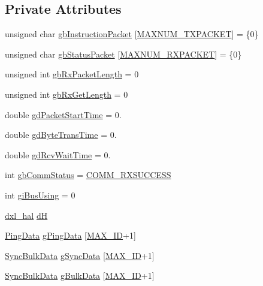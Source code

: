 \subsection*{Private Attributes}
\begin{DoxyCompactItemize}
\item 
unsigned char \hyperlink{classdynamixel2_a298efe9115fdbf77019af1001e801fb4}{gb\+Instruction\+Packet} \mbox{[}\hyperlink{dxl__hal_8h_ad753363487043da5d9fdd3fd1071f59e}{M\+A\+X\+N\+U\+M\+\_\+\+T\+X\+P\+A\+C\+K\+E\+T}\mbox{]} = \{0\}
\item 
unsigned char \hyperlink{classdynamixel2_a0776f210a190cf57d1a6faf9697a593d}{gb\+Status\+Packet} \mbox{[}\hyperlink{dxl__hal_8h_a37d5ce8f0a9ee058fa9674502c6a8b3a}{M\+A\+X\+N\+U\+M\+\_\+\+R\+X\+P\+A\+C\+K\+E\+T}\mbox{]} = \{0\}
\item 
unsigned int \hyperlink{classdynamixel2_a7ae9bffcc9f4b087c57640881ccbb378}{gb\+Rx\+Packet\+Length} = 0
\item 
unsigned int \hyperlink{classdynamixel2_ad82d286e6b47c7243a3c5fd5ced0ebf4}{gb\+Rx\+Get\+Length} = 0
\item 
double \hyperlink{classdynamixel2_ac9746f2c7ed6d706152d6d0d502993c0}{gd\+Packet\+Start\+Time} = 0.
\item 
double \hyperlink{classdynamixel2_a786e818a88ec65d3b7e2f30b55ec31ba}{gd\+Byte\+Trans\+Time} = 0.
\item 
double \hyperlink{classdynamixel2_ae7b830369861e191120f9b310a68e2d8}{gd\+Rcv\+Wait\+Time} = 0.
\item 
int \hyperlink{classdynamixel2_a703e327ba8ec5909c238dc94a00cb32d}{gb\+Comm\+Status} = \hyperlink{dynamixel_8h_a171328d9f298535c18d079f65e631434}{C\+O\+M\+M\+\_\+\+R\+X\+S\+U\+C\+C\+E\+S\+S}
\item 
int \hyperlink{classdynamixel2_a7fc43b4c4b7e36aa8f0420b037658f83}{gi\+Bus\+Using} = 0
\item 
\hyperlink{classdxl__hal}{dxl\+\_\+hal} \hyperlink{classdynamixel2_a69e9133771b69c828c277cb7191d3474}{d\+H}
\item 
\hyperlink{classdynamixel2_a0ca8255cb0a7a1584c9638d83196c7ae}{Ping\+Data} \hyperlink{classdynamixel2_ae5cf4b09150f4a480ee23279c4e97486}{g\+Ping\+Data} \mbox{[}\hyperlink{dynamixel_8h_a1cdef4472847c938fc165b7d2737c4e4}{M\+A\+X\+\_\+\+I\+D}+1\mbox{]}
\item 
\hyperlink{classdynamixel2_a7d3321dea922094901dd5b5afe31bb60}{Sync\+Bulk\+Data} \hyperlink{classdynamixel2_a5923ec2418ab7ea83cbe365ad8b200d5}{g\+Sync\+Data} \mbox{[}\hyperlink{dynamixel_8h_a1cdef4472847c938fc165b7d2737c4e4}{M\+A\+X\+\_\+\+I\+D}+1\mbox{]}
\item 
\hyperlink{classdynamixel2_a7d3321dea922094901dd5b5afe31bb60}{Sync\+Bulk\+Data} \hyperlink{classdynamixel2_a5083923283d17a820b3deb940c7211a5}{g\+Bulk\+Data} \mbox{[}\hyperlink{dynamixel_8h_a1cdef4472847c938fc165b7d2737c4e4}{M\+A\+X\+\_\+\+I\+D}+1\mbox{]}
\end{DoxyCompactItemize}


